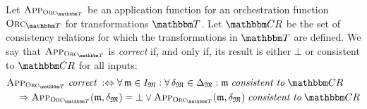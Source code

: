 \begin{definition}
    \label{def:applicationfunctioncorrectness}
    Let $\appfunction{\orcfunction{\transformationset{T}}}$ be an application function for an orchestration function $\orcfunction{\transformationset{T}}$ for transformations $\transformationset{T}$.
    Let $\consistencyrelationset{CR}$ be the set of consistency relations for which the transformations in $\transformationset{T}$ are defined.
    We say that $\appfunction{\orcfunction{\transformationset{T}}}$ is \emph{correct} if, and only if, its result is either $\bot$ or consistent to $\consistencyrelationset{CR}{}$ for all inputs:
    \begin{align*}
        &
        \appfunction{\orcfunction{\transformationset{T}}} \correctmath \equivalentperdefinition %
        \forall \modeltuple{m} \in \metamodeltupleinstanceset{M} : \forall \changetuple{\metamodeltuple{M}} \in \changeuniverse{\metamodeltuple{M}} :
        \modeltuple{m} \consistenttomath \consistencyrelationset{CR} \\
        & \formulaskip
        \Rightarrow \appfunction{\orcfunction{\transformationset{T}}}(\modeltuple{m}, \changetuple{\metamodeltuple{M}}) = \bot \lor \appfunction{\orcfunction{\transformationset{T}}}(\modeltuple{m}, \changetuple{\metamodeltuple{M}}) \consistenttomath \consistencyrelationset{CR}
    \end{align*}
\end{definition}
